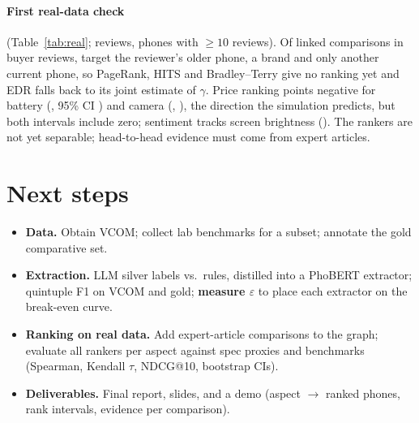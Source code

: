 \documentclass{article}
\begin{document}
\paragraph{First real-data check} (Table~\ref{tab:real}; \NReviews{} reviews, phones with ${\ge}10$ reviews). Of \NLinkedComps{} linked
comparisons in buyer reviews, \NEdgesOld{} target the reviewer's older phone, \NEdgesBrand{} a brand and only \NEdgesCatCat{} another current phone,
so PageRank, HITS and Bradley--Terry give no ranking yet and EDR falls back to its joint estimate of $\gamma$. Price ranking points negative for battery (\RealPriceBattery{}, 95\% CI
\RealPriceBatteryCI) and camera (\RealPriceCamera{}, \RealPriceCameraCI), the direction the simulation predicts, but both intervals include zero;
sentiment tracks screen brightness (\RealSentScreen). The rankers are not yet separable; head-to-head evidence must come from expert articles.
\begin{table}[h]\centering\small\setlength{\tabcolsep}{3.5pt}
\caption{Real data: Spearman $\rho$ (95\% bootstrap CI) against spec-sheet values; $n$ = phones.}\label{tab:real}

\end{table}

\section{Next steps}
\begin{itemize}
\item \textbf{Data.} Obtain VCOM; collect lab benchmarks for a subset; annotate the gold comparative set.
\item \textbf{Extraction.} LLM silver labels vs.\ rules, distilled into a PhoBERT extractor; quintuple F1 on VCOM and gold;
\textbf{measure $\varepsilon$} to place each extractor on the break-even curve.
\item \textbf{Ranking on real data.} Add expert-article comparisons to the graph; evaluate all rankers per aspect against spec proxies
and benchmarks (Spearman, Kendall $\tau$, NDCG@10, bootstrap CIs).
\item \textbf{Deliverables.} Final report, slides, and a demo (aspect $\to$ ranked phones, rank intervals, evidence per comparison).
\end{itemize}

{\fontsize{8}{9.6}\selectfont

}
\end{document}
